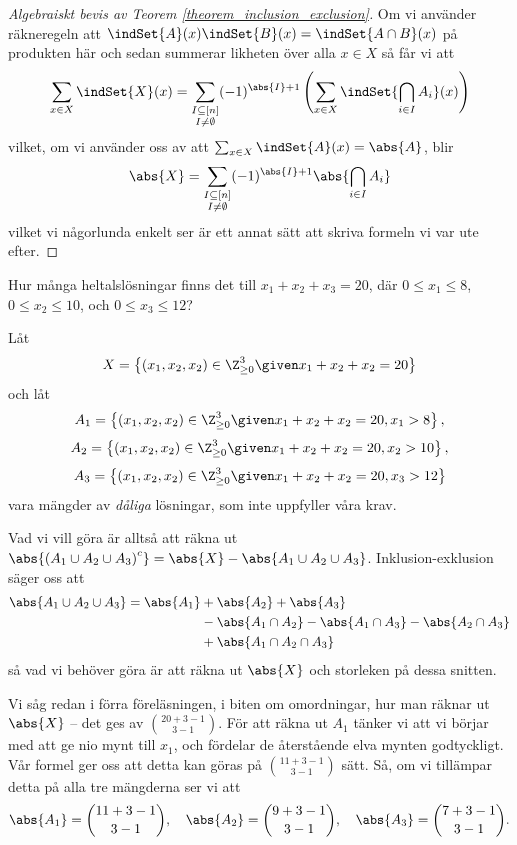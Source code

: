 \documentclass[nobib]{tufte-handout}
\begin{document}
\begin{proof}[Algebraiskt bevis av Teorem \ref{theorem_inclusion_exclusion}]
  Om vi använder räkneregeln att $\indSet{A}(x)\indSet{B}(x) = \indSet{A\cap B}(x)$ på produkten här och sedan summerar likheten över alla $x\in X$ så får vi att
  $$\sum_{x\in X} \indSet{X}(x) = \sum_{\substack{I \subseteq [n]\\I \neq \emptyset}} (-1)^{\abs{I} + 1}\left(\sum_{x\in X} \indSet{\bigcap_{i\in I} A_i}(x)\right)$$
  vilket, om vi använder oss av att $\sum_{x\in X} \indSet{A}(x) = \abs{A}$, blir
  $$\abs{X} = \sum_{\substack{I \subseteq [n]\\I \neq \emptyset}} (-1)^{\abs{I} + 1}\abs{\bigcap_{i\in I} A_i}$$
  vilket vi någorlunda enkelt ser är ett annat sätt att skriva formeln vi var ute efter.
\end{proof}

\begin{example}
  Hur många heltalslösningar finns det till $x_1 + x_2 + x_3 = 20$, där $0 \leq x_1 \leq 8$, $0 \leq x_2 \leq 10$, och $0 \leq x_3 \leq 12$?

  Låt
  $$X = \left\{(x_1, x_2, x_2) \in \Z_{\geq 0}^3 \given x_1 + x_2 + x_2 = 20\right\}$$
  och låt
  $$A_1 = \left\{(x_1, x_2, x_2) \in \Z_{\geq 0}^3 \given x_1 + x_2 + x_2 = 20, x_1 > 8\right\},$$
  $$A_2 = \left\{(x_1, x_2, x_2) \in \Z_{\geq 0}^3 \given x_1 + x_2 + x_2 = 20, x_2 > 10\right\},$$
  $$A_3 = \left\{(x_1, x_2, x_2) \in \Z_{\geq 0}^3 \given x_1 + x_2 + x_2 = 20, x_3 > 12\right\}$$
  vara mängder av \emph{dåliga} lösningar, som inte uppfyller våra krav.

  Vad vi vill göra är alltså att räkna ut $\abs{\left(A_1 \cup A_2 \cup A_3\right)^c} = \abs{X} - \abs{A_1 \cup A_2 \cup A_3}$. 
  Inklusion-exklusion säger oss att
  \begin{align*}
    \abs{A_1 \cup A_2 \cup A_3} = \abs{A_1}& + \abs{A_2} + \abs{A_3}\\
    &- \abs{A_1 \cap A_2} - \abs{A_1 \cap A_3} - \abs{A_2 \cap A_3}\\
    &+ \abs{A_1 \cap A_2 \cap A_3}
  \end{align*}
  så vad vi behöver göra är att räkna ut $\abs{X}$ och storleken på dessa snitten.

  Vi såg redan i förra föreläsningen, i biten om omordningar, hur man räknar ut $\abs{X}$ -- det ges av $\binom{20+3-1}{3-1}$. För att räkna ut $A_1$ tänker vi att vi börjar med att ge nio mynt till $x_1$, och fördelar de återstående elva mynten godtyckligt. Vår formel ger oss att detta kan göras på $\binom{11+3-1}{3-1}$ sätt. Så, om vi tillämpar detta på alla tre mängderna ser vi att
  $$\abs{A_1} = \binom{11+3-1}{3-1}, \quad\abs{A_2} = \binom{9+3-1}{3-1}, \quad\abs{A_3} = \binom{7+3-1}{3-1}.$$


\end{example}
\end{document}
